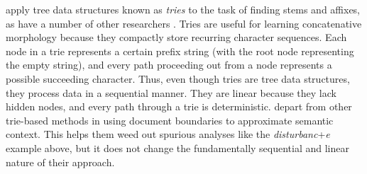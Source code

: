 {%
\cite{moon-et-al:2009} apply tree data structures known as \textit{tries} to the task of finding stems and affixes, as have a number of other researchers \citep[e.g.,][]{schone-and-jurafsky:2000, monson:2004, argamon:2004}.
Tries are useful for learning concatenative morphology because they compactly store recurring character sequences.
Each node in a trie represents a certain prefix string (with the root node representing the empty string), 
and every path proceeding out from a node represents a possible succeeding character. 
Thus, even though tries are tree data structures, they process data in a sequential manner. 
They 
are linear
because they lack hidden nodes, and every path through a trie is deterministic. 
 \cite{moon-et-al:2009} depart from other trie-based methods in using document 
 boundaries to approximate semantic context. 
 This helps them weed out spurious analyses like the \textit{disturbanc}+\textit{e} 
 example above, but it does not change the fundamentally sequential and linear nature of their approach.
%

}
